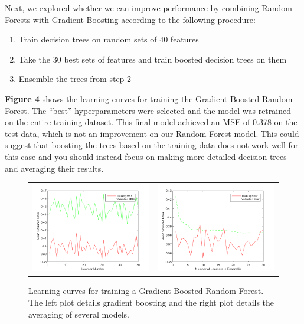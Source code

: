 \documentclass[12pt] {article}
\renewcommand{\baselinestretch}{1.2} %
\begin{document}
Next, we explored whether we can improve performance by combining Random Forests with Gradient Boosting according to the following procedure:
\begin{enumerate}
\item Train decision trees on random sets of 40 features
\item Take the 30 best sets of features and train boosted decision trees on them
\item Ensemble the trees from step 2
\end{enumerate}

\textbf{Figure 4} shows the learning curves for training the Gradient Boosted Random Forest. The ``best'' hyperparameters were selected and the model was retrained on the entire training dataset. This final model achieved an MSE of 0.378 on the test data, which is not an improvement on our Random Forest model. This could suggest that boosting the trees based on the training data does not work well for this case and you should instead focus on making more detailed decision trees and averaging their results. 

\renewcommand{\baselinestretch}{1.0} %
\begin{figure}[h!] \centering
\begin{tabular}{cc}
\includegraphics[width=.45\textwidth]{figdir/learnerNumVersusMSE.png} &
\includegraphics[width=.45\textwidth]{figdir/numLearnersVersusMSE2.png} \\
\end{tabular}
\caption{Learning curves for training a Gradient Boosted Random Forest. The left plot details gradient boosting and the right plot details the averaging of several models.}
\end{figure}
\renewcommand{\baselinestretch}{1.2} %
\end{document}
